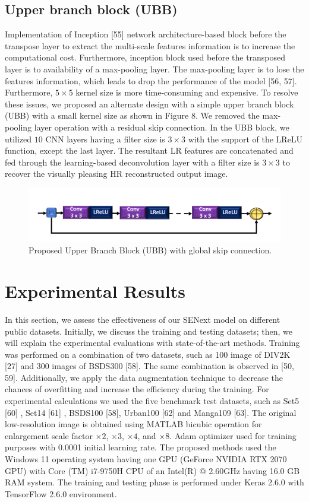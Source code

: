 \documentclass{ieeeaccess}
\begin{document}
\subsection{Upper branch block (UBB)}
Implementation of Inception [55] network architecture-based block before the transpose layer to extract the multi-scale features information is to increase the computational cost. Furthermore, inception block used before the transposed layer is to availability of a max-pooling layer. The max-pooling layer is to lose the features information, which leads to drop the performance of the model [56, 57]. Furthermore, $5\times5$ kernel size is more time-consuming and expensive. To resolve these issues, we proposed an alternate design with a simple upper branch block (UBB) with a small kernel size as shown in Figure 8. We removed the max-pooling layer operation with a residual skip connection. In the UBB block, we utilized $10$ CNN layers having a filter size is $3\times3$ with the support of the LReLU function, except the last layer. The resultant LR features are concatenated and fed through the learning-based deconvolution layer with a filter size is $3\times 3$ to recover the visually pleasing HR reconstructed output image.

\begin{figure}[ht]
  \includegraphics[width=\linewidth]{8FIGURE.pdf}
  \caption{Proposed Upper Branch Block (UBB) with global skip connection.}
  \label{fig:8}
\end{figure}



\section{Experimental Results}
In this section, we assess the effectiveness of our SENext model on different public datasets. Initially, we discuss the training and testing datasets; then, we will explain the experimental evaluations with state-of-the-art methods. Training was performed on a combination of two datasets, such as 100 image of DIV2K [27] and 300 images of BSDS300 [58].  The same combination is observed in [50, 59]. Additionally, we apply the data augmentation technique to decrease the chances of overfitting and increase the efficiency during the training. For experimental calculations we used the five benchmark test datasets, such as Set5 [60] , Set14 [61] , BSDS100 [58], Urban100  [62]  and Manga109  [63]. The original low-resolution image is obtained using MATLAB bicubic operation for enlargement scale factor $\times 2$, $\times 3$, $\times 4$, and $\times 8$. Adam optimizer used for training purposes with 0.0001 initial learning rate. The proposed methods used the Windows 11 operating system having one GPU (GeForce NVIDIA RTX 2070 GPU) with  Core (TM) i7-9750H CPU of an Intel(R) @ 2.60GHz having 16.0 GB RAM system. The training and testing phase is performed under Keras 2.6.0 with TensorFlow 2.6.0 environment.
\end{document}
